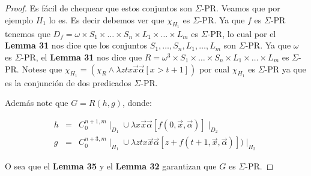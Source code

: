 \begin{proof}
    \par Es fácil de chequear que estos conjuntos son $\Sigma$-PR. Veamos que por ejemplo $H_{1}$ lo es. Es decir
    debemos ver que $\chi_{H_{1}}$ es $\Sigma$-PR. Ya que $f$ es $\Sigma$-PR tenemos que $D_{f} = \omega \times S_{1}
    \times \dotsc \times S_{n} \times L_{1} \times \dotsc \times L_{m}$ es $\Sigma$-PR, lo cual por el \textbf{Lemma 31}
    nos dice que los conjuntos $S_{1}, \dotsc, S_{n}, L_{1}, \dotsc, L_{m}$ son $\Sigma$-PR. Ya que $\omega$ es
    $\Sigma$-PR, el \textbf{Lemma 31} nos dice que $R = \omega^{3} \times S_{1} \times \dotsc \times S_{n} \times L_{1}
    \times \dotsc \times L_{m}$ es $\Sigma$-PR. Notese que $\chi_{H_{1}} = (\chi_{R} \wedge \lambda ztx\vec{x}
    \vec{\alpha}\left[x > t+1\right])$ por cual $\chi_{H_{1}}$ es $\Sigma$-PR ya que es la conjunción de dos predicados
    $\Sigma$-PR.

    \par Además note que $G = R(h,g)$, donde:

    \begin{eqnarray}
      \nonumber h &=& C_{0}^{n+1,m} \mid_{D_{1}} \cup \lambda x\vec{x}\vec{\alpha}\left[f(0,\vec{x},\vec{\alpha})\right]
      \mid_{D_{2}} \\
      \nonumber g &=& C_{0}^{n+3,m} \mid_{H_{1}} \cup \lambda ztx\vec{x}\vec{\alpha}\left[z+f(t+1,\vec{x},\vec{\alpha})
      \right]) \mid_{H_{2}}
    \end{eqnarray}

    \par O sea que el \textbf{Lemma 35} y el \textbf{Lemma 32} garantizan que $G$ es $\Sigma$-PR.
  \end{proof}

